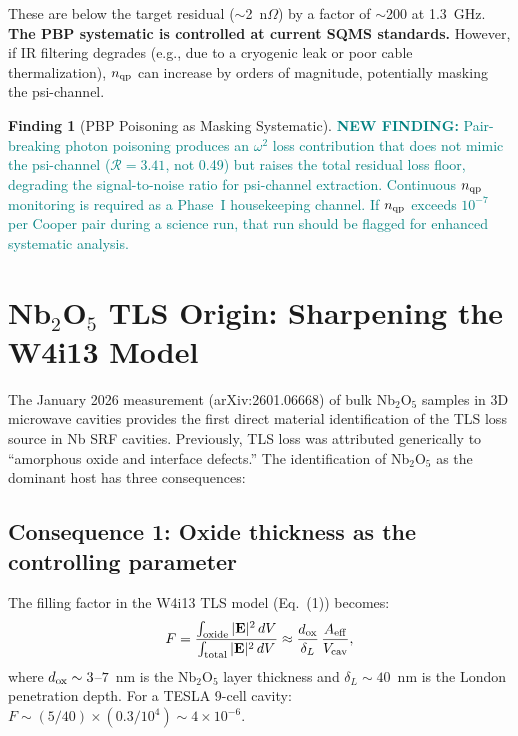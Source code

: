 \documentclass[11pt]{article}
\newcommand{\ee}[1]{\times 10^{#1}}
\newcommand{\newfinding}[1]{\textcolor{teal}{\textbf{NEW FINDING:} #1}}
\theoremstyle{definition}
\newtheorem{finding}[theorem]{Finding}
\theoremstyle{remark}
\begin{document}
These are below the target residual ($\sim$2~n$\Omega$) by a factor
of $\sim$200 at 1.3~GHz. \textbf{The PBP systematic is controlled at
current SQMS standards.} However, if IR filtering degrades (e.g., due
to a cryogenic leak or poor cable thermalization), $n_{\rm qp}$ can
increase by orders of magnitude, potentially masking the psi-channel.

\begin{finding}[PBP Poisoning as Masking Systematic]
\label{find:pbp}
\newfinding{Pair-breaking photon poisoning produces an $\omega^2$ loss
contribution that does not mimic the psi-channel ($\mathcal{R} = 3.41$,
not 0.49) but raises the total residual loss floor, degrading the
signal-to-noise ratio for psi-channel extraction. Continuous $n_{\rm qp}$
monitoring is required as a Phase~I housekeeping channel. If
$n_{\rm qp}$ exceeds $10^{-7}$ per Cooper pair during a science run,
that run should be flagged for enhanced systematic analysis.}
\end{finding}


\section{Nb$_2$O$_5$ TLS Origin: Sharpening the W4i13 Model}
\label{sec:nb2o5}

The January 2026 measurement (arXiv:2601.06668) of bulk Nb$_2$O$_5$
samples in 3D microwave cavities provides the first direct material
identification of the TLS loss source in Nb SRF cavities. Previously,
TLS loss was attributed generically to ``amorphous oxide and interface
defects.'' The identification of Nb$_2$O$_5$ as the dominant host has
three consequences:

\subsection{Consequence 1: Oxide thickness as the controlling parameter}

The filling factor in the W4i13 TLS model (Eq.~(1)) becomes:
\begin{equation}
F = \frac{\int_{\rm oxide} |\mathbf{E}|^2\,dV}{\int_{\rm total}
|\mathbf{E}|^2\,dV} \approx \frac{d_{\rm ox}}{\delta_L}\,
\frac{A_{\rm eff}}{V_{\rm cav}},
\end{equation}
where $d_{\rm ox} \sim 3$--$7$~nm is the Nb$_2$O$_5$ layer thickness
and $\delta_L \sim 40$~nm is the London penetration depth. For a
TESLA 9-cell cavity: $F \sim (5/40) \times (0.3/10^4) \sim 4\ee{-6}$.
\end{document}
